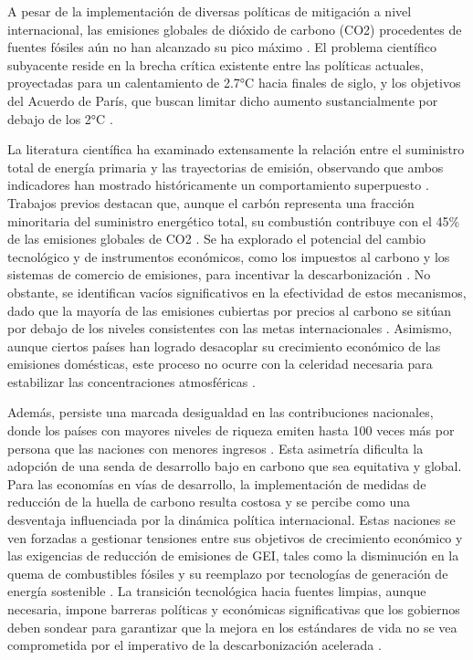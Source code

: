 \documentclass[
]{book}
\begin{document}
A pesar de la implementación de diversas políticas de mitigación a nivel internacional, las emisiones globales de dióxido de carbono (CO2) procedentes de fuentes fósiles aún no han alcanzado su pico máximo \citep{ref8}. El problema científico subyacente reside en la brecha crítica existente entre las políticas actuales, proyectadas para un calentamiento de 2.7°C hacia finales de siglo, y los objetivos del Acuerdo de París, que buscan limitar dicho aumento sustancialmente por debajo de los 2°C \citep{ref11}.

La literatura científica ha examinado extensamente la relación entre el suministro total de energía primaria y las trayectorias de emisión, observando que ambos indicadores han mostrado históricamente un comportamiento superpuesto \citep{ref107}. Trabajos previos destacan que, aunque el carbón representa una fracción minoritaria del suministro energético total, su combustión contribuye con el 45\% de las emisiones globales de CO2 \citep{ref112}. Se ha explorado el potencial del cambio tecnológico y de instrumentos económicos, como los impuestos al carbono y los sistemas de comercio de emisiones, para incentivar la descarbonización \citep{ref114}. No obstante, se identifican vacíos significativos en la efectividad de estos mecanismos, dado que la mayoría de las emisiones cubiertas por precios al carbono se sitúan por debajo de los niveles consistentes con las metas internacionales \citep{ref121}. Asimismo, aunque ciertos países han logrado desacoplar su crecimiento económico de las emisiones domésticas, este proceso no ocurre con la celeridad necesaria para estabilizar las concentraciones atmosféricas \citep{ref15}.

Además, persiste una marcada desigualdad en las contribuciones nacionales, donde los países con mayores niveles de riqueza emiten hasta 100 veces más por persona que las naciones con menores ingresos \citep{ref12}. Esta asimetría dificulta la adopción de una senda de desarrollo bajo en carbono que sea equitativa y global. Para las economías en vías de desarrollo, la implementación de medidas de reducción de la huella de carbono resulta costosa y se percibe como una desventaja influenciada por la dinámica política internacional. Estas naciones se ven forzadas a gestionar tensiones entre sus objetivos de crecimiento económico y las exigencias de reducción de emisiones de GEI, tales como la disminución en la quema de combustibles fósiles y su reemplazo por tecnologías de generación de energía sostenible \citep{ref2}. La transición tecnológica hacia fuentes limpias, aunque necesaria, impone barreras políticas y económicas significativas que los gobiernos deben sondear para garantizar que la mejora en los estándares de vida no se vea comprometida por el imperativo de la descarbonización acelerada \citep{ref3}.
\end{document}
